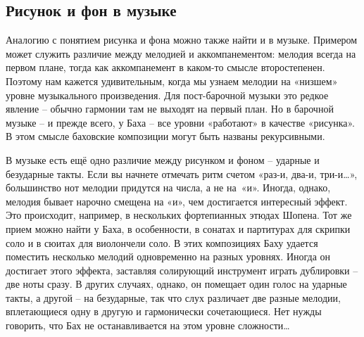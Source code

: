 \documentclass[../main.tex]{subfiles}
\begin{document}


\subsection{Рисунок и фон в музыке}

Аналогию с понятием рисунка и фона можно также найти и в музыке. Примером может служить различие между мелодией и аккомпанементом: мелодия всегда на первом плане, тогда как аккомпанемент в каком-то смысле второстепенен. Поэтому нам кажется удивительным, когда мы узнаем мелодии на «низшем» уровне музыкального произведения. Для пост-барочной музыки это редкое явление \--- обычно гармонии там не выходят на первый план. Но в барочной музыке \--- и прежде всего, у Баха \--- все уровни «работают» в качестве «рисунка». В этом смысле баховские композиции могут быть названы рекурсивными.

В музыке есть ещё одно различие между рисунком и фоном \--- ударные и безударные такты. Если вы начнете отмечать ритм счетом «раз-и, два-и, три-и\ldots», большинство нот мелодии придутся на числа, а не на~«и». Иногда, однако, мелодия бывает нарочно смещена на «и», чем достигается интересный эффект. Это происходит, например, в нескольких фортепианных этюдах Шопена. Тот же прием можно найти у Баха, в особенности, в сонатах и партитурах для скрипки соло и в сюитах для виолончели соло. В этих композициях Баху удается поместить несколько мелодий одновременно на разных уровнях. Иногда он достигает этого эффекта, заставляя солирующий инструмент играть дублировки \--- две ноты сразу. В других случаях, однако, он помещает один голос на ударные такты, а другой \--- на безударные, так что слух различает две разные мелодии, вплетающиеся одну в другую и гармонически сочетающиеся. Нет нужды говорить, что Бах не останавливается на этом уровне сложности\ldots{}
\end{document}
